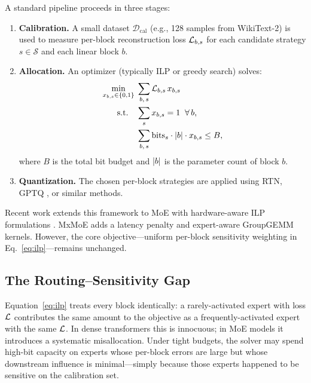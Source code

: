 A standard pipeline proceeds in three stages:
\begin{enumerate}
\item \textbf{Calibration.} A small dataset $\mathcal{D}_{\mathrm{cal}}$ (e.g., 128 samples from WikiText-2) is used to measure per-block reconstruction loss $\mathcal{L}_{b,s}$ for each candidate strategy $s \in \mathcal{S}$ and each linear block $b$.
\item \textbf{Allocation.} An optimizer (typically ILP \citep{yao2021hawqv3} or greedy search) solves:
\begin{align}
\label{eq:ilp}
  \min_{x_{b,s} \in \{0,1\}} \;&\sum_{b,\,s} \mathcal{L}_{b,s}\, x_{b,s} \\
  \text{s.t.}\quad
  &\sum_{s} x_{b,s} = 1 \;\;\forall\, b, \nonumber\\
  &\sum_{b,\,s} \mathrm{bits}_s \cdot \lvert b \rvert \cdot x_{b,s} \le B, \nonumber
\end{align}
where $B$ is the total bit budget and $\lvert b \rvert$ is the parameter count of block $b$.
\item \textbf{Quantization.} The chosen per-block strategies are applied using RTN, GPTQ \citep{frantar2023gptq}, or similar methods.
\end{enumerate}

Recent work extends this framework to MoE with hardware-aware ILP formulations \citep{duanmu2025mxmoe,li2024quantmoebench}. MxMoE \citep{duanmu2025mxmoe} adds a latency penalty and expert-aware GroupGEMM kernels. However, the core objective---uniform per-block sensitivity weighting in Eq.~\ref{eq:ilp}---remains unchanged.

\subsection{The Routing--Sensitivity Gap}

Equation~\ref{eq:ilp} treats every block identically: a rarely-activated expert with loss $\mathcal{L}$ contributes the same amount to the objective as a frequently-activated expert with the same $\mathcal{L}$. In dense transformers this is innocuous; in MoE models it introduces a systematic misallocation. Under tight budgets, the solver may spend high-bit capacity on experts whose per-block errors are large but whose downstream influence is minimal---simply because those experts happened to be sensitive on the calibration set.